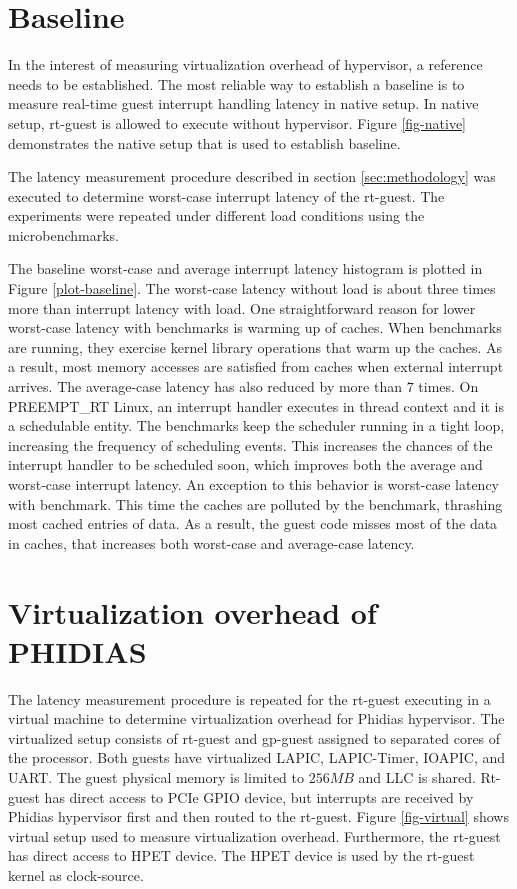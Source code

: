 \section{Baseline}
In the interest of measuring virtualization overhead of hypervisor, a reference needs to be established. 
The most reliable way to establish a baseline is to measure real-time guest interrupt handling latency
in native setup. In native setup, rt-guest is allowed to execute without hypervisor. Figure \ref{fig-native}
demonstrates the native setup that is used to establish baseline.


The latency measurement procedure described in section \ref{sec:methodology} was executed to determine worst-case interrupt latency
of the rt-guest. The experiments were repeated under different load conditions using the microbenchmarks.


The baseline worst-case and average interrupt latency histogram is plotted in Figure \ref{plot-baseline}.
The worst-case latency without load is about three times more than interrupt latency with load. 
One straightforward reason for lower worst-case latency with benchmarks is warming up of caches.
When benchmarks are running, they exercise kernel library operations that warm up the caches. 
As a result, most memory accesses are satisfied from caches when external interrupt arrives.
The average-case latency has also reduced by more than $7$ times.
On PREEMPT\_RT Linux, an interrupt handler executes in thread context and it is a schedulable entity. 
The benchmarks keep the scheduler running in a tight loop, increasing the frequency of scheduling events.
This increases the chances of the interrupt handler to be scheduled soon, 
which improves both the average and worst-case interrupt latency.
An exception to this behavior is worst-case latency with \mcachepressure{} benchmark.
This time the caches are polluted by the benchmark, thrashing most cached entries of data.
As a result, the guest code misses most of the data in caches, that increases both worst-case and average-case latency.


\section{Virtualization overhead of PHIDIAS} \label{sec:virtual-overhead}
The latency measurement procedure is repeated for the rt-guest 
executing in a virtual machine to determine virtualization overhead for Phidias hypervisor.
The virtualized setup consists of rt-guest and gp-guest assigned to separated cores of the processor.
Both guests have virtualized LAPIC, LAPIC-Timer, IOAPIC, and UART.
The guest physical memory is limited to $256MB$ and LLC is shared.
Rt-guest has direct access to  PCIe GPIO device, 
but interrupts are received by Phidias hypervisor first and then routed to the rt-guest.
Figure \ref{fig-virtual} shows virtual setup used to measure virtualization overhead.
Furthermore, the rt-guest has direct access to HPET device. 
The HPET device is used by the rt-guest kernel as clock-source.

